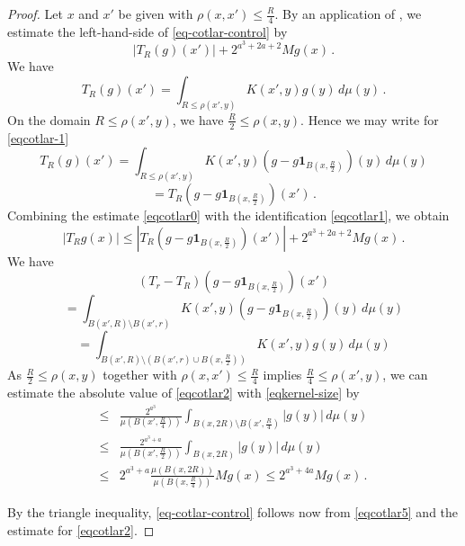 \begin{proof}
Let $x$ and $x'$ be given with $\rho(x,x')\le\frac {R}{4}$.
By an application of , we estimate
the left-hand-side of
\eqref{eq-cotlar-control} by
\begin{equation}\label{eqcotlar0}
|T_R(g)(x')|+
2^{a^3 + 2a + 2} Mg(x)\,.
\end{equation}
We  have
\begin{equation}
\label{eqcotlar-1}
T_R(g)(x')=
\int_{R\le\rho(x',y)} K(x',y) g(y) \, d\mu(y)\, .
\end{equation}
On the domain $R\le\rho(x',y)$, we have $\frac {R}2\le\rho(x,y)$. Hence we may write
for \eqref{eqcotlar-1}
\begin{equation*}
T_R(g)(x')=\int_{R\le\rho(x',y)} K(x',y) (g-g\mathbf{1}_{B(x,\frac {R} 2)})(y) \,d\mu(y)
\end{equation*}
\begin{equation}\label{eqcotlar1}
=T_R(g-g\mathbf{1}_{B(x,\frac {R} 2)})(x')\, .
\end{equation}
Combining the estimate \eqref{eqcotlar0} with the identification \eqref{eqcotlar1}, we obtain
\begin{equation}\label{eqcotlar5}
\left|T_R g(x)
\right|\le
|T_R(g-g\mathbf{1}_{B(x,\frac {R} 2)})(x')|+
2^{a^3 + 2a + 2} Mg(x)\, .
\end{equation}
We  have
\begin{equation*}
(T_r-T_R)(g-g\mathbf{1}_{B(x,\frac {R} 2)})(x')
\end{equation*}
\begin{equation*}
= \int_{B(x',R)\setminus B(x',r)} K(x',y) (g-g\mathbf{1}_{B(x,\frac {R} 2)})(y) \,d\mu(y)
\end{equation*}
\begin{equation}\label{eqcotlar2}
= \int_{B(x',R)\setminus (B(x',r) \cup B(x,\frac{R}{2}))} K(x',y) g(y) \,d\mu(y)
\end{equation}
As $\frac{R}{2}\le\rho(x,y)$ together with $\rho(x,x')\le\frac {R}{4}$ implies
$\frac {R}{4}\le\rho(x',y)$, we can estimate the absolute value of \eqref{eqcotlar2} with \eqref{eqkernel-size} by
\begin{align*}
\le &\frac{2^{a^3}}{\mu(B(x',\frac{R}{4}))} \int_{B(x,2R)\setminus B(x',\frac{R}{4})}
|g(y)|\, d\mu(y) \\
\le &\frac{2^{a^3+a}}{\mu(B(x',\frac{R}{2}))} \int_{B(x,2R)}
|g(y)|\, d\mu(y) \\
\le &2^{a^3+a} \frac{\mu(B(x,2R))}{\mu(B(x,\frac{R}{4}))} Mg(x) \le 2^{a^3 + 4a} Mg(x)\, .
\end{align*}

By the triangle inequality, \eqref{eq-cotlar-control} follows now from \eqref{eqcotlar5} and the estimate for \eqref{eqcotlar2}.
\end{proof}

